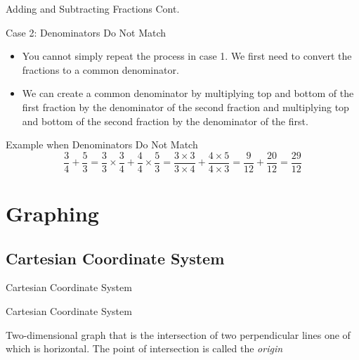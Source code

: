 \documentclass{beamer}
\begin{document}
\begin{frame}{Adding and Subtracting Fractions Cont.}
  \begin{block}{Case 2: Denominators Do Not Match}
    \begin{itemize}
      \item You cannot simply repeat the process in case 1. We first need to convert the fractions to a common denominator.
      \item We can create a common denominator by multiplying top and bottom of the first fraction by the denominator of the second fraction and multiplying top and bottom of the second fraction by the denominator of the first.
    \end{itemize}

  \end{block}

  \begin{exampleblock}{Example when Denominators Do Not Match}
  $$\frac{3}{4}+ \frac{5}{3} = \frac{3}{3}\times \frac{3}{4} + \frac{4}{4} \times \frac{5}{3} = \frac{3\times 3}{3\times 4} + \frac{4\times 5}{4\times 3} = \frac{9}{12}+\frac{20}{12}= \frac{29}{12}$$
  \end{exampleblock}

\end{frame}

\section{Graphing}

\subsection{Cartesian Coordinate System}

\begin{frame}{Cartesian Coordinate System}

\begin{block}{Cartesian Coordinate System}

Two-dimensional graph that is the intersection of two perpendicular lines one of which is horizontal. The point of intersection is called the \textit{origin}
\end{block}
\begin{center}

\end{center}
\end{frame}
\end{document}
